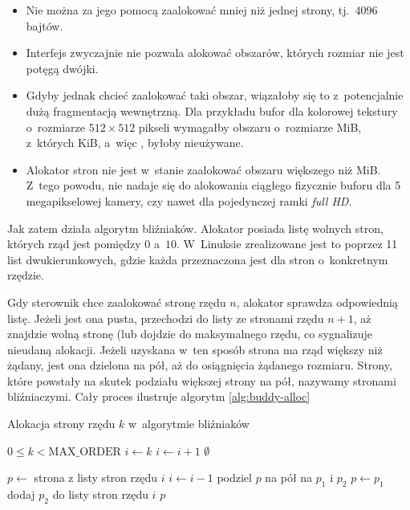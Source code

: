 \begin{itemize}
\item Nie można za jego pomocą zaalokować mniej niż jednej strony,
  tj.\ 4096 bajtów.
\item Interfejs zwyczajnie nie pozwala alokować obszarów, których
  rozmiar nie jest potęgą dwójki.
\item Gdyby jednak chcieć zaalokować taki obszar, wiązałoby się to
  z~potencjalnie dużą fragmentacją wewnętrzną.  Dla przykładu bufor
  dla kolorowej tekstury o~rozmiarze $512 \times 512$ pikseli
  wymagałby obszaru o~rozmiarze \unit[1]{MiB}, z~których
  \unit[256]{KiB}, a~więc , byłoby nieużywane.
\item Alokator stron nie jest w~stanie zaalokować obszaru większego
  niż \unit[4]{MiB}.  Z~tego powodu, nie nadaje się do alokowania
  ciągłego fizycznie buforu dla 5 megapikselowej kamery, czy nawet dla
  pojedynczej ramki {\it full HD}.
\end{itemize}

Jak zatem działa algorytm bliźniaków.  Alokator posiada listę wolnych
stron, których rząd jest pomiędzy $0$ a~$10$.  W~Linuksie zrealizowane
jest to poprzez 11 list dwukierunkowych, gdzie każda przeznaczona jest
dla stron o~konkretnym rzędzie.

Gdy sterownik chce zaalokować stronę rzędu $n$, alokator sprawdza
odpowiednią listę.  Jeżeli jest ona pusta, przechodzi do listy ze
stronami rzędu $n+1$, aż znajdzie wolną stronę (lub dojdzie do
maksymalnego rzędu, co sygnalizuje nieudaną alokacji.  Jeżeli uzyskana
w~ten sposób strona ma rząd większy niż żądany, jest ona dzielona na
pół, aż do osiągnięcia żądanego rozmiaru.  Strony, które powstały na
skutek podziału większej strony na pół, nazywamy stronami
bliźniaczymi.  Cały proces ilustruje algorytm \ref{alg:buddy-alloc}

\begin{algorithm}
\caption{Alokacja strony rzędu $k$ w~algorytmie bliźniaków}
\label{alg:buddy-alloc}
\begin{algorithmic}[1]
\Require $0 \leq k < \mathrm{MAX\_ORDER}$
    \State $i \gets k$
        \State $i \gets i + 1$
            \State \Return $\emptyset$
        \EndIf
    \EndWhile

    \State $p \gets$ strona z listy stron rzędu $i$
        \State $i \gets i - 1$
        \State podziel $p$ na pół na $p_1$ i $p_2$
        \State $p \gets p_1$
        \State dodaj $p_2$ do listy stron rzędu $i$
    \EndWhile
    \State \Return $p$
\EndFunction
\end{algorithmic}
\end{algorithm}

